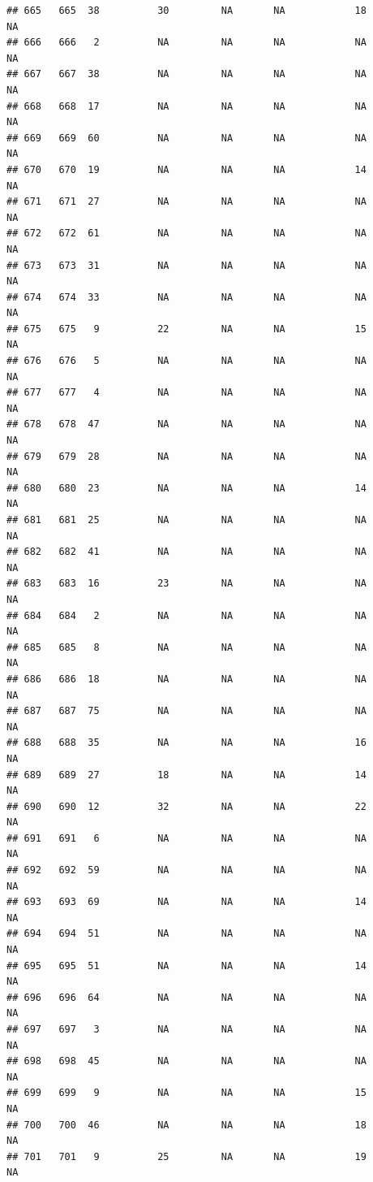 \documentclass[man]{apa6}
\begin{document}
\begin{verbatim}
## 665   665  38          30         NA       NA            18       NA
## 666   666   2          NA         NA       NA            NA       NA
## 667   667  38          NA         NA       NA            NA       NA
## 668   668  17          NA         NA       NA            NA       NA
## 669   669  60          NA         NA       NA            NA       NA
## 670   670  19          NA         NA       NA            14       NA
## 671   671  27          NA         NA       NA            NA       NA
## 672   672  61          NA         NA       NA            NA       NA
## 673   673  31          NA         NA       NA            NA       NA
## 674   674  33          NA         NA       NA            NA       NA
## 675   675   9          22         NA       NA            15       NA
## 676   676   5          NA         NA       NA            NA       NA
## 677   677   4          NA         NA       NA            NA       NA
## 678   678  47          NA         NA       NA            NA       NA
## 679   679  28          NA         NA       NA            NA       NA
## 680   680  23          NA         NA       NA            14       NA
## 681   681  25          NA         NA       NA            NA       NA
## 682   682  41          NA         NA       NA            NA       NA
## 683   683  16          23         NA       NA            NA       NA
## 684   684   2          NA         NA       NA            NA       NA
## 685   685   8          NA         NA       NA            NA       NA
## 686   686  18          NA         NA       NA            NA       NA
## 687   687  75          NA         NA       NA            NA       NA
## 688   688  35          NA         NA       NA            16       NA
## 689   689  27          18         NA       NA            14       NA
## 690   690  12          32         NA       NA            22       NA
## 691   691   6          NA         NA       NA            NA       NA
## 692   692  59          NA         NA       NA            NA       NA
## 693   693  69          NA         NA       NA            14       NA
## 694   694  51          NA         NA       NA            NA       NA
## 695   695  51          NA         NA       NA            14       NA
## 696   696  64          NA         NA       NA            NA       NA
## 697   697   3          NA         NA       NA            NA       NA
## 698   698  45          NA         NA       NA            NA       NA
## 699   699   9          NA         NA       NA            15       NA
## 700   700  46          NA         NA       NA            18       NA
## 701   701   9          25         NA       NA            19       NA

\end{verbatim}
\end{document}
